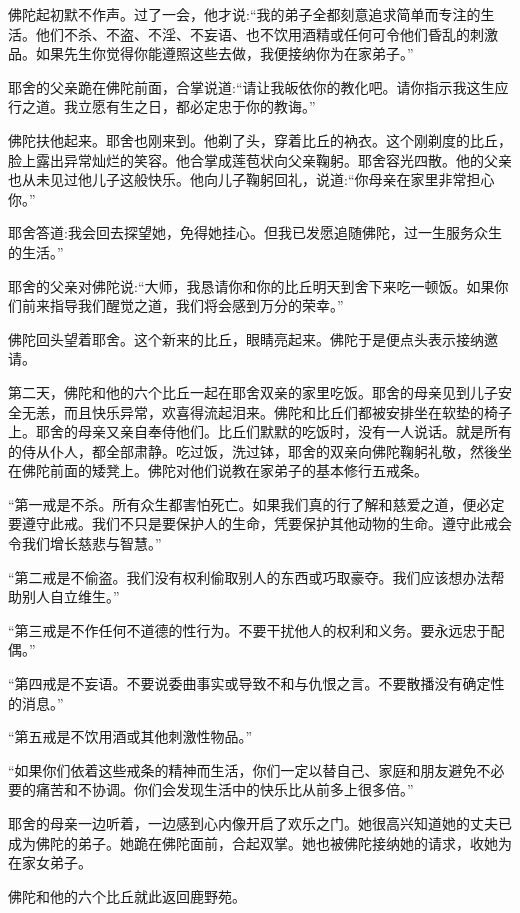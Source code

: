 \documentclass[12pt,twoside,openany]{book}
\begin{document}
佛陀起初默不作声。过了一会，他才说:“我的弟子全都刻意追求简单而专注的生活。他们不杀、不盗、不淫、不妄语、也不饮用酒精或任何可令他们昏乱的刺激品。如果先生你觉得你能遵照这些去做，我便接纳你为在家弟子。”

耶舍的父亲跪在佛陀前面，合掌说道:“请让我皈依你的教化吧。请你指示我这生应行之道。我立愿有生之日，都必定忠于你的教诲。”

佛陀扶他起来。耶舍也刚来到。他剃了头，穿着比丘的衲衣。这个刚剃度的比丘，脸上露出异常灿烂的笑容。他合掌成莲苞状向父亲鞠躬。耶舍容光四散。他的父亲也从未见过他儿子这般快乐。他向儿子鞠躬回礼，说道:“你母亲在家里非常担心你。”

耶舍答道:我会回去探望她，免得她挂心。但我已发愿追随佛陀，过一生服务众生的生活。”

耶舍的父亲对佛陀说:“大师，我恳请你和你的比丘明天到舍下来吃一顿饭。如果你们前来指导我们醒觉之道，我们将会感到万分的荣幸。”

佛陀回头望着耶舍。这个新来的比丘，眼睛亮起来。佛陀于是便点头表示接纳邀请。

第二天，佛陀和他的六个比丘一起在耶舍双亲的家里吃饭。耶舍的母亲见到儿子安全无恙，而且快乐异常，欢喜得流起泪来。佛陀和比丘们都被安排坐在软垫的椅子上。耶舍的母亲又亲自奉侍他们。比丘们默默的吃饭时，没有一人说话。就是所有的侍从仆人，都全部肃静。吃过饭，洗过钵，耶舍的双亲向佛陀鞠躬礼敬，然後坐在佛陀前面的矮凳上。佛陀对他们说教在家弟子的基本修行五戒条。

“第一戒是不杀。所有众生都害怕死亡。如果我们真的行了解和慈爱之道，便必定要遵守此戒。我们不只是要保护人的生命，凭要保护其他动物的生命。遵守此戒会令我们增长慈悲与智慧。”

“第二戒是不偷盗。我们没有权利偷取别人的东西或巧取豪夺。我们应该想办法帮助别人自立维生。”

“第三戒是不作任何不道德的性行为。不要干扰他人的权利和义务。要永远忠于配偶。”

“第四戒是不妄语。不要说委曲事实或导致不和与仇恨之言。不要散播没有确定性的消息。”

“第五戒是不饮用酒或其他刺激性物品。”

“如果你们依着这些戒条的精神而生活，你们一定以替自己、家庭和朋友避免不必要的痛苦和不协调。你们会发现生活中的快乐比从前多上很多倍。”

耶舍的母亲一边听着，一边感到心内像开启了欢乐之门。她很高兴知道她的丈夫已成为佛陀的弟子。她跪在佛陀面前，合起双掌。她也被佛陀接纳她的请求，收她为在家女弟子。

佛陀和他的六个比丘就此返回鹿野苑。

\end{document}

